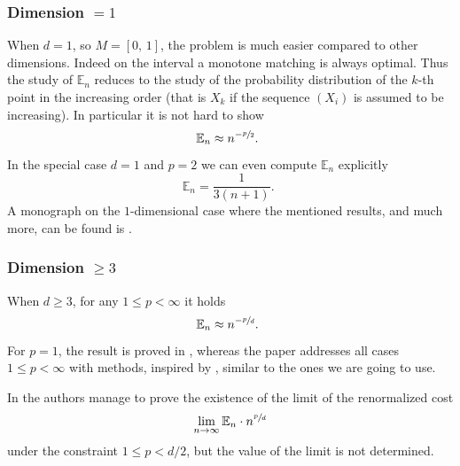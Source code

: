 \documentclass[JEP,XML,SOM,Unicode]{cedram}
\newcounter{results}[section]
\theoremstyle{plain}
\theoremstyle{definition}
\numberwithin{equation}{section}
\newcommand{\cc}[2]{\ensuremath{\left[#1,\,#2\right]}}
\newcommand{\fullstop}{\ensuremath{\text{. }}}
\begin{document}
\subsubsection*{Dimension $=1$}
When $d=1$, so $M=\cc01$, the problem is much easier compared to
other dimensions. Indeed on the interval a monotone matching is always optimal.
Thus the study of $\mathbb E_n$ reduces to the study of the probability distribution of
the $k$-th point in the increasing order (that is $X_k$ if the sequence $(X_i)$ is assumed to be
increasing). In particular it is not hard to show
\begin{equation*}
\mathbb E_n \approx n^{-\sfrac p2} \fullstop
\end{equation*}
In the special case $d=1$ and $p=2$ we can even compute $\mathbb E_n$ explicitly
\begin{equation*}
\mathbb E_n = \frac 1{3(n+1)} \fullstop
\end{equation*}
A monograph on the $1$-dimensional case where the mentioned results, and much more, can be found
is \cite{Bobkov2014}.
\subsubsection*{Dimension $\ge 3$}
When $d\ge 3$, for any $1\le p < \infty$ it holds
\begin{equation*}
\mathbb E_n \approx n^{-\sfrac pd} \fullstop
\end{equation*}
For $p=1$, the result is proved in \cite{Dobric1995,Talagrand1992}, whereas the
paper \cite{Ledoux2017} addresses all cases $1\le p < \infty$ with methods,
inspired by \cite{Ambrosio-Stra-Trevisan2018}, similar to the ones we are going to use.

In \cite[Th.\,2]{Barthe2013} the authors manage to prove the existence of the limit of the renormalized cost
\begin{equation*}
\lim_{n\to\infty}\mathbb E_n \cdot n^{\sfrac pd}
\end{equation*}
under the constraint $1\le p < d/2$, but the value of the limit is not determined.
\end{document}
